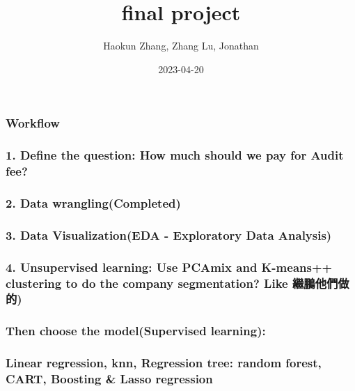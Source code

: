 \documentclass[
]{article}
\title{final project}
\author{Haokun Zhang, Zhang Lu, Jonathan}
\date{2023-04-20}
\begin{document}
\maketitle

\hypertarget{workflow}{%
\subsubsection{Workflow}\label{workflow}}

\hypertarget{define-the-question-how-much-should-we-pay-for-audit-fee}{%
\subsubsection{1. Define the question: How much should we pay for Audit
fee?}\label{define-the-question-how-much-should-we-pay-for-audit-fee}}

\hypertarget{data-wranglingcompleted}{%
\subsubsection{2. Data
wrangling(Completed)}\label{data-wranglingcompleted}}

\hypertarget{data-visualizationeda---exploratory-data-analysis}{%
\subsubsection{3. Data Visualization(EDA - Exploratory Data
Analysis)}\label{data-visualizationeda---exploratory-data-analysis}}

\hypertarget{unsupervised-learning-use-pcamix-and-k-means-clustering-to-do-the-company-segmentation-like-ux7e7cux9d6cux4ed6ux5011ux505aux7684}{%
\subsubsection{4. Unsupervised learning: Use PCAmix and K-means++
clustering to do the company segmentation? Like
繼鵬他們做的)}\label{unsupervised-learning-use-pcamix-and-k-means-clustering-to-do-the-company-segmentation-like-ux7e7cux9d6cux4ed6ux5011ux505aux7684}}

\hypertarget{then-choose-the-modelsupervised-learning}{%
\subsubsection{Then choose the model(Supervised
learning):}\label{then-choose-the-modelsupervised-learning}}

\hypertarget{linear-regression-knn-regression-tree-random-forest-cart-boosting-lasso-regression}{%
\subsubsection{Linear regression, knn, Regression tree: random forest,
CART, Boosting \& Lasso
regression}\label{linear-regression-knn-regression-tree-random-forest-cart-boosting-lasso-regression}}
\end{document}
